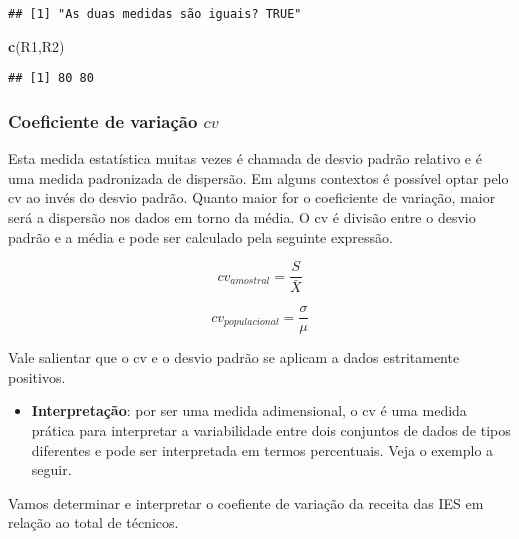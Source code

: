 \documentclass[12pt,]{style/krantz}
\makeatletter
\newenvironment{Shaded}{\begin{snugshade}}{\end{snugshade}}
\newcommand{\KeywordTok}[1]{\textcolor[rgb]{0.13,0.29,0.53}{\textbf{#1}}}
\newcommand{\NormalTok}[1]{#1}
\providecommand{\tightlist}{%
  \setlength{\itemsep}{0pt}\setlength{\parskip}{0pt}}
\renewenvironment{quote}{\begin{VF}}{\end{VF}}
\newenvironment{kframe}{%
\medskip{}
\setlength{\fboxsep}{.8em}
 \def\at@end@of@kframe{}%
 \ifinner\ifhmode%
  \def\at@end@of@kframe{\end{minipage}}%
  \begin{minipage}{\columnwidth}%
 \fi\fi%
 \def\FrameCommand##1{\hskip\@totalleftmargin \hskip-\fboxsep
 \colorbox{shadecolor}{##1}\hskip-\fboxsep
     \hskip-\linewidth \hskip-\@totalleftmargin \hskip\columnwidth}%
 \MakeFramed {\advance\hsize-\width
   \@totalleftmargin\z@ \linewidth\hsize
   \@setminipage}}%
 {\par\unskip\endMakeFramed%
 \at@end@of@kframe}
\renewenvironment{Shaded}{\begin{kframe}}{\end{kframe}}
\theoremstyle{definition}
\theoremstyle{definition}
\theoremstyle{definition}
\theoremstyle{remark}
\let\BeginKnitrBlock\begin \let\EndKnitrBlock\end
\makeatother
\begin{document}
\begin{verbatim}
## [1] "As duas medidas são iguais? TRUE"
\end{verbatim}

\begin{Shaded}
\begin{Highlighting}[]
\KeywordTok{c}\NormalTok{(R1,R2)}
\end{Highlighting}
\end{Shaded}

\begin{verbatim}
## [1] 80 80
\end{verbatim}

\subsubsection{\texorpdfstring{Coeficiente de variação
\(cv\)}{Coeficiente de variação cv}}\label{coeficiente-de-variacao-cv}

Esta medida estatística muitas vezes é chamada de desvio padrão relativo
e é uma medida padronizada de dispersão. Em alguns contextos é possível
optar pelo cv ao invés do desvio padrão. Quanto maior for o coeficiente
de variação, maior será a dispersão nos dados em torno da média. O cv é
divisão entre o desvio padrão e a média e pode ser calculado pela
seguinte expressão.

\[cv_{amostral} = \frac{S}{\bar X}\]

\[cv_{populacional} = \frac{\sigma}{\mu}\]

\begin{quote}
Vale salientar que o cv e o desvio padrão se aplicam a dados
estritamente positivos.
\end{quote}

\begin{itemize}
\tightlist
\item
  \textbf{Interpretação}: por ser uma medida adimensional, o cv é uma
  medida prática para interpretar a variabilidade entre dois conjuntos
  de dados de tipos diferentes e pode ser interpretada em termos
  percentuais. Veja o exemplo a seguir.
\end{itemize}

\BeginKnitrBlock{example}
\protect\hypertarget{exm:unnamed-chunk-66}{}{\label{exm:unnamed-chunk-66}
}Vamos determinar e interpretar o coefiente de variação da receita das
IES em relação ao total de técnicos.
\EndKnitrBlock{example}
\end{document}
